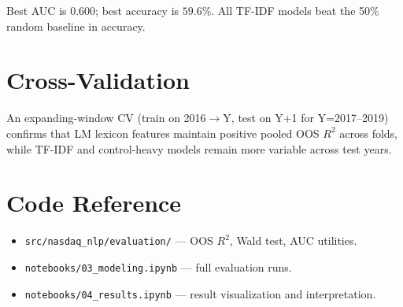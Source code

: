 \documentclass[12pt,a4paper]{article}
\begin{document}
Best AUC is $0.600$; best accuracy is $59.6\%$.
All TF-IDF models beat the 50\% random baseline in accuracy.

\section{Cross-Validation}

An expanding-window CV (train on 2016$\rightarrow$Y, test on Y+1 for Y=2017--2019)
confirms that LM lexicon features maintain positive pooled OOS $R^2$ across folds,
while TF-IDF and control-heavy models remain more variable across test years.

\section{Code Reference}

\begin{itemize}
  \item \texttt{src/nasdaq\_nlp/evaluation/} --- OOS $R^2$, Wald test, AUC utilities.
  \item \texttt{notebooks/03\_modeling.ipynb} --- full evaluation runs.
  \item \texttt{notebooks/04\_results.ipynb} --- result visualization and interpretation.
\end{itemize}
\end{document}
